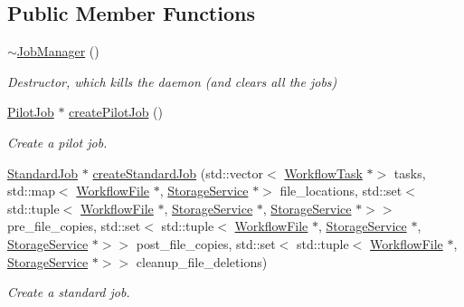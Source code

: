 \subsection*{Public Member Functions}
\begin{DoxyCompactItemize}
\item 
\mbox{\label{classwrench_1_1_job_manager_ab675524284c14255fb65267ff63341f6}} 
\hyperlink{classwrench_1_1_job_manager_ab675524284c14255fb65267ff63341f6}{$\sim$\+Job\+Manager} ()
\begin{DoxyCompactList}\small\item\em Destructor, which kills the daemon (and clears all the jobs) \end{DoxyCompactList}\item 
\hyperlink{classwrench_1_1_pilot_job}{Pilot\+Job} $\ast$ \hyperlink{classwrench_1_1_job_manager_a9ef786306730359866e3fd2bd3aadaf7}{create\+Pilot\+Job} ()
\begin{DoxyCompactList}\small\item\em Create a pilot job. \end{DoxyCompactList}\item 
\hyperlink{classwrench_1_1_standard_job}{Standard\+Job} $\ast$ \hyperlink{classwrench_1_1_job_manager_a7f3873e56c8813c90b66683690d6b328}{create\+Standard\+Job} (std\+::vector$<$ \hyperlink{classwrench_1_1_workflow_task}{Workflow\+Task} $\ast$$>$ tasks, std\+::map$<$ \hyperlink{classwrench_1_1_workflow_file}{Workflow\+File} $\ast$, \hyperlink{classwrench_1_1_storage_service}{Storage\+Service} $\ast$$>$ file\+\_\+locations, std\+::set$<$ std\+::tuple$<$ \hyperlink{classwrench_1_1_workflow_file}{Workflow\+File} $\ast$, \hyperlink{classwrench_1_1_storage_service}{Storage\+Service} $\ast$, \hyperlink{classwrench_1_1_storage_service}{Storage\+Service} $\ast$$>$$>$ pre\+\_\+file\+\_\+copies, std\+::set$<$ std\+::tuple$<$ \hyperlink{classwrench_1_1_workflow_file}{Workflow\+File} $\ast$, \hyperlink{classwrench_1_1_storage_service}{Storage\+Service} $\ast$, \hyperlink{classwrench_1_1_storage_service}{Storage\+Service} $\ast$$>$$>$ post\+\_\+file\+\_\+copies, std\+::set$<$ std\+::tuple$<$ \hyperlink{classwrench_1_1_workflow_file}{Workflow\+File} $\ast$, \hyperlink{classwrench_1_1_storage_service}{Storage\+Service} $\ast$$>$$>$ cleanup\+\_\+file\+\_\+deletions)
\begin{DoxyCompactList}\small\item\em Create a standard job. \end{DoxyCompactList}\item 

\end{DoxyCompactItemize}

